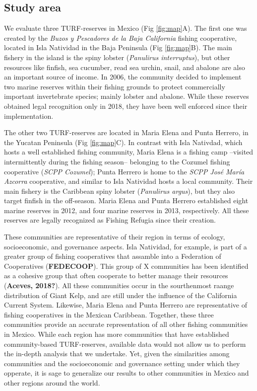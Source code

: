 \documentclass{frontiersSCNS}
\theoremstyle{definition}
\theoremstyle{definition}
\theoremstyle{definition}
\theoremstyle{remark}
\begin{document}
\subsection{Study area}\label{study-area}

We evaluate three TURF-reserves in Mexico (Fig \ref{fig:map}A). The
first one was created by the \emph{Buzos y Pescadores de la Baja
California} fishing cooperative, located in Isla Natividad in the Baja
Peninsula (Fig \ref{fig:map}B). The main fishery in the island is the
spiny lobster (\emph{Panulirus interruptus}), but other resources like
finfish, sea cucumber, read sea urchin, snail, and abalone are also an
important source of income. In 2006, the community decided to implement
two marine reserves within their fishing grounds to protect commercially
important invertebrate species; mainly lobster and abalone. While these
reserves obtained legal recognition only in 2018, they have been well
enforced since their implementation.

The other two TURF-reserves are located in Maria Elena and Punta
Herrero, in the Yucatan Peninsula (Fig \ref{fig:map}C). In contrast with
Isla Nativdad, which hosts a well established fishing community, Maria
Elena is a fishing camp --visited intermittently during the fishing
season-- belonging to the Cozumel fishing cooperative (\emph{SCPP
Cozumel}); Punta Herrero is home to the \emph{SCPP José María Azcorra}
cooperative, and similar to Isla Natividad hosts a local community.
Their main fishery is the Caribbean spiny lobster (\emph{Panulirus
argus}), but they also target finfish in the off-season. Maria Elena and
Punta Herrero established eight marine reserves in 2012, and four marine
reserves in 2013, respectively. All these reserves are legally
recognized as Fishing Refugia since their creation.

These communities are representative of their region in terms of
ecology, socioeconomic, and governance aspects. Isla Natividad, for
example, is part of a greater group of fishing cooperatives that
assamble into a Federation of Cooperatives (\textbf{FEDECOOP}). This
group of X communities has been identified as a cohesive group that
often cooperate to better manage their resources
\citep{mccay_2017-1m,mccay_2014-CN} (\textbf{Aceves, 2018?}). All these
communities occur in the sourthenmost raange distribution of Giant Kelp,
and are still under the influence of the California Current System.
Likewise, Maria Elena and Punta Herrero are representative of fishing
cooperatives in the Mexican Caribbean. Together, these three communities
provide an accurate representation of all other fishing communities in
Mexico. While each region has more communities that have established
community-based TURF-reserves, available data would not allow us to
perform the in-depth analysis that we undertake. Yet, given the
similarities among communities and the socioeconomic and governance
setting under which they opperate, it is sage to generalize our results
to other communities in Mexico and other regions around the world.
\end{document}
